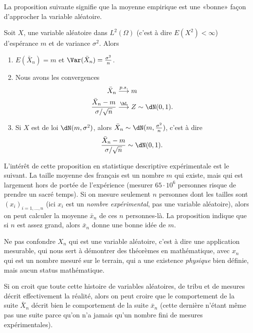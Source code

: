 La proposition suivante signifie que la moyenne empirique est une «bonne» façon d'approcher la variable aléatoire.
\begin{proposition}
    Soit \( X\), une variable aléatoire dans \( L^2(\Omega)\) (c'est à dire \( E(X^2)<\infty\)) d'espérance \( m\) et de variance \( \sigma^2\). Alors
    \begin{enumerate}
        \item
            \( E(\bar X_n)=m\) et \( \Var(\bar X_n)=\frac{ \sigma^2 }{ n }\).
        \item
            Nous avons les convergences
            \begin{subequations}
                \begin{align}
                    \bar X_n&\stackrel{p.s.}{\longrightarrow} m\\
                    \frac{ \bar X_n-m }{ \sigma/\sqrt{n} }&\stackrel{\hL}{\longrightarrow} Z\sim\dN(0,1).
                \end{align}
            \end{subequations}
        \item
            Si \( X\) est de loi \( \dN(m,\sigma^2)\), alors \( \bar X_n\sim\dN(m,\frac{ \sigma^2 }{ n })\), c'est à dire
            \begin{equation}
                \frac{ \bar X_n -m}{ \sigma/\sqrt{n} }\sim\dN(0,1).
            \end{equation}
            
            
    \end{enumerate}
    
\end{proposition}

\begin{remark}
    L'intérêt de cette proposition en statistique descriptive expérimentale est le suivant. La taille moyenne des français est un nombre \( m\) qui existe, mais qui est largement hors de portée de l'expérience (mesurer \( 65\cdot 10^6\) personnes risque de prendre un sacré temps). Si on mesure seulement \( n\) personnes dont les tailles sont \( (x_i)_{i=1,\ldots, n}\) (ici \( x_i\) est un \emph{nombre expérimental}, pas une variable aléatoire), alors on peut calculer la moyenne \( \bar x_n\) de ces \( n\) personnes-là. La proposition indique que si \( n\) est assez grand, alors \( \bar x_n\) donne une bonne idée de \( m\).

    Ne pas confondre \( X_n\) qui est une variable aléatoire, c'est à dire une application mesurable, qui nous sert à démontrer des théorèmes en mathématique, avec \( x_n\) qui est un nombre mesuré sur le terrain, qui a une existence \emph{physique} bien définie, mais aucun status mathématique.

    Si on croit que toute cette histoire de variables aléatoires, de tribu et de mesures décrit effectivement la réalité, alors on peut croire que le comportement de la suite \( \bar X_n\) décrit bien le comportement de la suite \( \bar x_n\) (cette dernière n'étant même pas une suite parce qu'on n'a jamais qu'un nombre fini de mesures expérimentales).
\end{remark}

